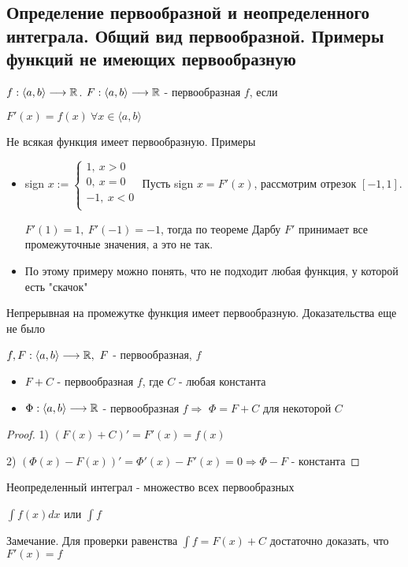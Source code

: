 \subsection{Определение первообразной и неопределенного интеграла. Общий вид первообразной. Примеры функций не имеющих первообразную \href{https://youtu.be/p9C57KDo1Yg?t=3244}{\Walley}}

\begin{conj}
    $f: \langle a, b \rangle \longrightarrow \mathbb{R}$. $F: \langle a, b \rangle \longrightarrow \mathbb{R}$ - первообразная $f$, если

    $F'(x) = f(x)\ \forall x\in \langle a, b \rangle$
\end{conj}

Не всякая функция имеет первообразную. Примеры
\begin{itemize}
    \item sign $x:= \begin{cases}
        1,\ x > 0\\
        0,\ x = 0\\
        -1,\ x < 0\\
    \end{cases}$
    Пусть sign $x = F'(x)$, рассмотрим отрезок $[-1, 1]$.

    $F'(1) = 1,\ F'(-1) = -1$, тогда по теореме Дарбу $F'$ принимает все промежуточные значения, а это не так.

    \item По этому примеру можно понять, что не подходит любая функция, у которой есть "скачок"
\end{itemize}

\begin{theorem-non}
    Непрерывная на промежутке функция имеет первообразную. Доказательства еще не было
\end{theorem-non}

\begin{theorem-non}
    $f, F: \langle a, b \rangle \longrightarrow \mathbb{R},\ F$ - первообразная, $f$
    \begin{itemize}
        \item $F + C$ - первообразная $f$, где $C$ - любая константа
        \item $\Phi: \langle a, b \rangle \longrightarrow \mathbb{R}$ - первообразная $f \Rightarrow$ $\Phi = F+C$ для некоторой $C$
    \end{itemize}
\end{theorem-non}

\begin{proof}
    1) $(F(x)+C)' = F'(x) = f(x)$
    
    2) $(\Phi(x)-F(x))' = \Phi'(x) - F'(x) = 0 \Rightarrow \Phi - F$ - константа
\end{proof}

\begin{conj}
    Неопределенный интеграл - множество всех первообразных

    $\int f(x) dx$ или $\int f$
\end{conj}

Замечание. Для проверки равенства $\int f = F(x) + C$ достаточно доказать, что $F'(x) = f$